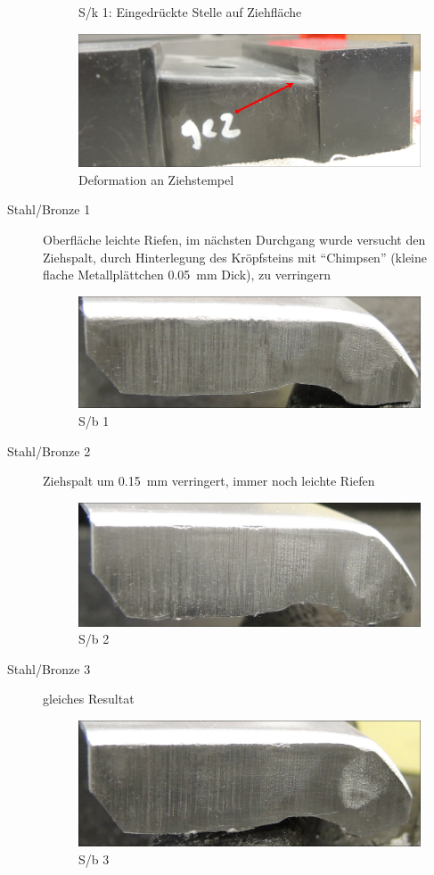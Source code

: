 \documentclass[12pt,a4paper,parskip]{scrartcl}
\begin{document}
\begin{description}
\begin{figure}[H]
\caption{S/k 1: Eingedrückte Stelle auf Ziehfläche}
\label{fig:sk1}
\end{figure}
\begin{figure}[H]
\centering
\includegraphics[width=.8\textwidth]{PunchDefektGut}
\caption{Deformation an Ziehstempel}
\label{fig:punchdefect}
\end{figure}
\item[Stahl/Bronze 1] Oberfläche leichte Riefen, im nächsten Durchgang wurde versucht den Ziehspalt,  durch Hinterlegung des Kröpfsteins mit "`Chimpsen"' (kleine flache Metallplättchen  \SI{0.05}{\milli\meter} Dick), zu verringern
\begin{figure}[H]
\centering
\includegraphics[width=.8\textwidth]{Sb1a}
\caption{S/b 1}
\label{fig:sb1}
\end{figure}
\item[Stahl/Bronze 2] Ziehspalt um \SI{0.15}{\milli\meter} verringert, immer noch leichte Riefen
\begin{figure}[H]
\centering
\includegraphics[width=.8\textwidth]{Sb2}
\caption{S/b 2 }
\label{sb2}
\end{figure}
\item[Stahl/Bronze 3] gleiches Resultat
\begin{figure}[H]
\centering
\includegraphics[width=.8\textwidth]{Sb3}
\caption{S/b 3}
\label{fig:sb3}
\end{figure}


\end{description}
\end{document}
